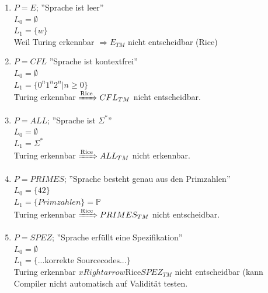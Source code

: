 \begin{enumerate}
	\item $P=E$; ''Sprache ist leer''\\
		$L_0 = \emptyset$ \\
		$L_1 = \{w\}$ \\
		Weil Turing erkennbar $\Rightarrow E_{TM}$ nicht entscheidbar (Rice)
	\item $P = CFL$ ''Sprache ist kontextfrei'' \\
		$L_0 = \emptyset$ \\
		$L_1 = \{0^n1^n2^n | n \geq 0\}$ \\
		Turing erkennbar $\xRightarrow{\text{Rice}} CFL_{TM}$ nicht entscheidbar.
	\item $P = ALL$; ''Sprache ist $\Sigma^\ast$'' \\
		$L_0 = \emptyset$ \\
		$L_1 = \Sigma^\ast$ \\
		Turing erkennbar $\xRightarrow{\text{Rice}} ALL_{TM}$ nicht erkennbar.
	\item $P = PRIMES$; ''Sprache besteht genau aus den Primzahlen'' \\
		$L_0 = \{ 42 \}$ \\
		$L_1 = \{Primzahlen\} = \mathbb{P}$ \\
		Turing erkennbar $\xRightarrow{\text{Rice}} PRIMES_{TM}$ nicht entscheidbar.
	\item $P = SPEZ$; ''Sprache erfüllt eine Spezifikation'' \\
		$L_0 = \emptyset$ \\
		$L_1 = \{...\text{korrekte Sourcecodes}...\}$ \\
		Turing erkennbar $xRightarrow{\text{Rice}} SPEZ_{TM}$ nicht entscheidbar (kann Compiler nicht automatisch auf Validität testen.
\end{enumerate}


